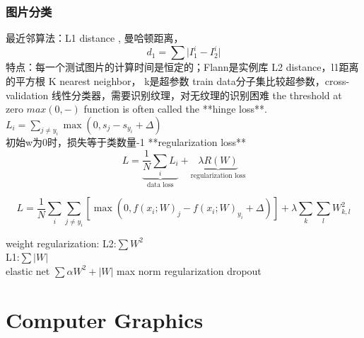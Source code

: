 \documentclass[UTF8]{../computerUniverse}
\begin{document}
\subsection{图片分类}
    最近邻算法：L1 distance , 曼哈顿距离，
    \begin{equation}
        d_1=\sum \lvert I_1^i -I_2^i \lvert
    \end{equation}
    特点：每一个测试图片的计算时间是恒定的；Flann是实例库
    L2 distance，l1距离的平方根
    K nearest neighbor， k是超参数
    train data分子集比较超参数，cross-validation 
    线性分类器，需要识别纹理，对无纹理的识别困难
    the threshold at zero \(max(0,-)\) function is often called the **hinge loss**. \\
    $
    L_i = \sum_{j\neq y_i} \max(0, s_j - s_{y_i} + \Delta)
    $\\
    初始w为0时，损失等于类数量-1
    **regularization loss**\\
    \begin{equation}
        L =  \underbrace{ \frac{1}{N} \sum_i L_i }_\text{data loss} + \underbrace{ \lambda R(W) }_\text{regularization loss}
    \end{equation}

    \begin{equation}
        L = \frac{1}{N} \sum_i \sum_{j\neq y_i} \left[ \max(0, f(x_i; W)_j - f(x_i; W)_{y_i} + \Delta) \right] + \lambda \sum_k\sum_l W_{k,l}^2
    \end{equation}
     
%

    weight regularization:
    L2:$\sum W^2$\\
    L1:$\sum |W|$\\
    elastic net $\sum \alpha W^2+|W|$
    max norm regularization
    dropout 



\chapter{Computer Graphics}
\end{document}
